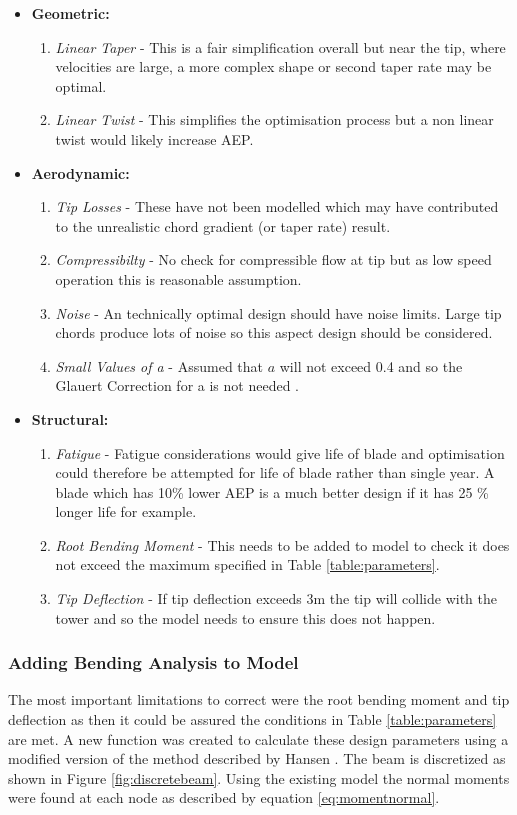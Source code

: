 \documentclass[11pt]{article}
\begin{document}
\begin{itemize}
\item{\textbf{Geometric:}}
\begin{enumerate}
\item{\textit{Linear Taper} - This is a fair simplification overall but near the tip, where velocities are large, a more complex shape or second taper rate may be optimal.}
\item{\textit{Linear Twist} - This simplifies the optimisation process but a non linear twist would likely increase AEP.}
\end{enumerate}
\item{\textbf{Aerodynamic:}}
\begin{enumerate}
\item{\textit{Tip Losses} - These have not been modelled which may have contributed to the unrealistic chord gradient (or taper rate) result.}
\item{\textit{Compressibilty} - No check for compressible flow at tip but as low speed operation this is reasonable assumption.}
\item{\textit{Noise} - An technically optimal design should have noise limits. Large tip chords produce lots of noise so this aspect design should be considered.}
\item{\textit{Small Values of a} - Assumed that $a$ will not exceed 0.4 and so the Glauert Correction for a is not needed \cite{Hansen}.}
\end{enumerate}
\item{\textbf{Structural:}}
\begin{enumerate}
\item{\textit{Fatigue} - Fatigue considerations would give life of blade and optimisation could therefore be attempted for life of blade rather than single year. A blade which has 10\% lower AEP is a much better design if it has 25 \% longer life for example.}
\item{\textit{Root Bending Moment} - This needs to be added to model to check it does not exceed the maximum specified in Table \ref{table:parameters}. }
\item{\textit{Tip Deflection} - If tip deflection exceeds 3m the tip will collide with the tower and so the model needs to ensure this does not happen.}
\end{enumerate}
\end{itemize}


\subsubsection{Adding Bending Analysis to Model}
The most important limitations to correct were the root bending moment and tip deflection as then it could be assured the conditions in Table \ref{table:parameters} are met. A new function was created to calculate these design parameters using a modified version of the method described by Hansen \cite{Hansen}. The beam is discretized as shown in Figure \ref{fig:discretebeam}. Using the existing model the normal moments were found at each node as described by equation \ref{eq:momentnormal}. 
\end{document}
